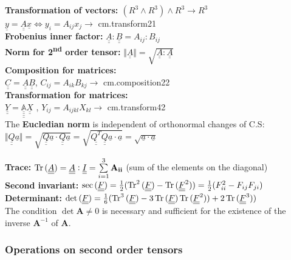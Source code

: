 \textbf{Transformation of vectors: $ (R^3 \wedge R^3)\wedge R^3 \rightarrow R^3 $} \\ $ \underline{y} = \underline{\underline{A}} \underline{x} \Leftrightarrow y_i = A_{ij}x_j \rightarrow $ cm.transform21 \\
\textbf{Frobenius inner factor:} $ \underline{\underline{A}} : \underline{\underline{B}} = A_{ij} : B_{ij} $ \\
\textbf{Norm for 2\textsuperscript{nd} order tensor:} $\Vert \underline{\underline{A}} \Vert = \sqrt{\underline{\underline{A}} : \underline{\underline{A}}}$ \\
\textbf{Composition for matrices:} \\ $ \underline{\underline{C}} = \underline{\underline{A}} \underline{\underline{B}} $, $ C_{ij} = A_{ik} B_{kj} \rightarrow $ cm.composition22 \\
\textbf{Transformation for matrices:} \\ $ \underline{\underline{Y}} = \underline{\underline{\underline{\underline{\mathbb{A}}}}} \underline{\underline{X}}$ , $ Y_{ij} = A_{ijkl} X_{kl} \rightarrow $ cm.transform42 \\

The \textbf{Eucledian norm} is independent of orthonormal changes of C.S: \\
$ \Vert \underline{\underline{Q}} \underline{a} \Vert = \sqrt{\underline{\underline{Q}} \underline{a} \cdot \underline{\underline{Q}} \underline{a}} = \sqrt{\underline{\underline{Q^T}} \underline{\underline{Q}} \underline{a} \cdot \underline{a}} = \sqrt{\underline{a} \cdot \underline{a}}$

\textbf{Trace:}	$\operatorname{Tr}{(\underline{\underline{A}})} = \underline{\underline{A}} : \underline{\underline{I}} = \sum \limits_{i=1}^{3} \mathbf{A_{ii}}$ (sum of the elements on the diagonal)\\
\textbf{Second invariant:} $ \sec{(\underline{\underline{F}})} = \frac{1}{2} (\operatorname{Tr}^2{(\underline{\underline{F}})} - \operatorname{Tr}{(\underline{\underline{F}}^2)}) = \frac{1}{2}(F_{ii}^2 - F_{ij} F_{ji})$ \\
\textbf{Determinant:} $\det{(\underline{\underline{F}})} = \frac{1}{6} (\operatorname{Tr}^3{(\underline{\underline{F}})} - 3\operatorname{Tr}{(\underline{\underline{F}}}) \operatorname{Tr}{(\underline{\underline{F}}^2)}) + 2\operatorname{Tr}{(\underline{\underline{F}}^3)})$ \\
The condition $\det{\mathbf{A}} \neq 0$ is necessary and sufficient for the existence of the inverse $\mathbf{A}^{-1}$ of $\mathbf{A}$.

\subsubsection*{Operations on second order tensors}

